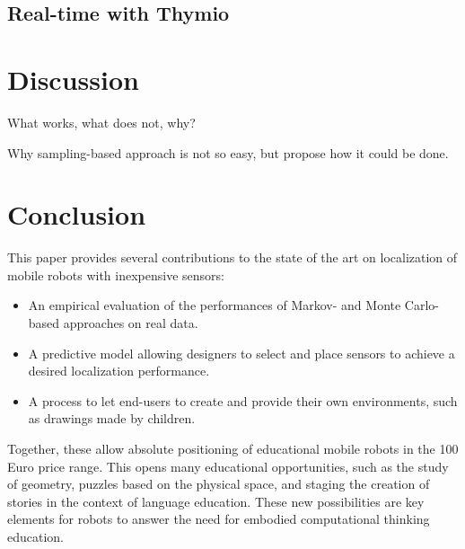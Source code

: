 \documentclass[letterpaper, 10pt, conference]{ieeeconf}
\begin{document}
\subsection{Real-time with Thymio}

\section{Discussion}

What works, what does not, why?

Why sampling-based approach is not so easy, but propose how it could be done.

\section{Conclusion}

This paper provides several contributions to the state of the art on localization of mobile robots with inexpensive sensors:
\begin{itemize}
\item An empirical evaluation of the performances of Markov- and Monte Carlo-based approaches on real data.
\item A predictive model allowing designers to select and place sensors to achieve a desired localization performance.
\item A process to let end-users to create and provide their own environments, such as drawings made by children.
\end{itemize}
Together, these allow absolute positioning of educational mobile robots in the 100 Euro price range.
This opens many educational opportunities, such as the study of geometry, puzzles based on the physical space, and staging the creation of stories in the context of language education.
These new possibilities are key elements for robots to answer the need for embodied computational thinking education.



\end{document}
